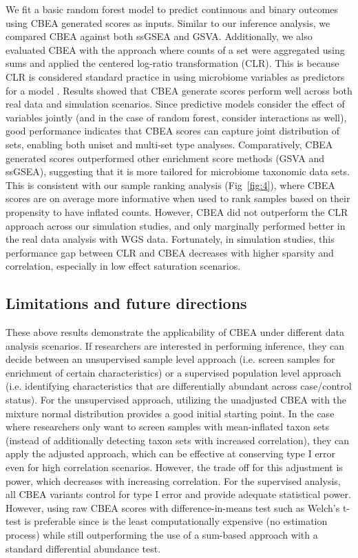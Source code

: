 \documentclass[10pt,letterpaper]{article}
\begin{document}
We fit a basic random forest model \cite{breiman2001} to predict continuous and binary outcomes using CBEA generated scores as inputs. Similar to our inference analysis, we compared CBEA against both ssGSEA and GSVA. Additionally, we also evaluated CBEA with the approach where counts of a set were aggregated using sums and applied the centered log-ratio transformation (CLR). This is because CLR is considered standard practice in using microbiome variables as predictors for a model \cite{gloor2017}. Results showed that CBEA generate scores perform well across both real data and simulation scenarios. Since predictive models consider the effect of variables jointly (and in the case of random forest, consider interactions as well), good performance indicates that CBEA scores can capture joint distribution of sets, enabling both uniset and multi-set type analyses. Comparatively, CBEA generated scores outperformed other enrichment score methods (GSVA and ssGSEA), suggesting that it is more tailored for microbiome taxonomic data sets. This is consistent with our sample ranking analysis (Fig~\ref{fig:4}), where CBEA scores are on average more informative when used to rank samples based on their propensity to have inflated counts. However, CBEA did not outperform the CLR approach across our simulation studies, and only marginally performed better in the real data analysis with WGS data. Fortunately, in simulation studies, this performance gap between CLR and CBEA decreases with higher sparsity and correlation, especially in low effect saturation scenarios.  

\subsection*{Limitations and future directions} 

These above results demonstrate the applicability of CBEA under different data analysis scenarios. If researchers are interested in performing inference, they can decide between an unsupervised sample level approach (i.e. screen samples for enrichment of certain characteristics) or a supervised population level approach (i.e. identifying characteristics that are differentially abundant across case/control status). For the unsupervised approach, utilizing the unadjusted CBEA with the mixture normal distribution provides a good initial starting point. In the case where researchers only want to screen samples with mean-inflated taxon sets (instead of additionally detecting taxon sets with increased correlation), they can apply the adjusted approach, which can be effective at conserving type I error even for high correlation scenarios. However, the trade off for this adjustment is power, which decreases with increasing correlation. For the supervised analysis, all CBEA variants control for type I error and provide adequate statistical power. However, using raw CBEA scores with difference-in-means test such as Welch's t-test is preferable since is the least computationally expensive (no estimation process) while still outperforming the use of a sum-based approach with a standard differential abundance test.     
\end{document}
